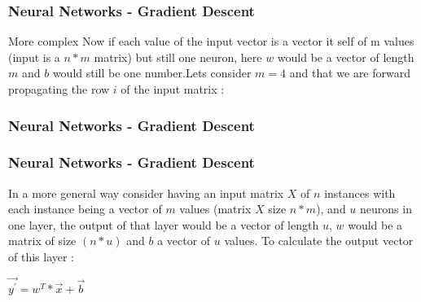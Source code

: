 \documentclass{beamer}
\begin{document}
\begin{frame}
\frametitle{Neural Networks - Gradient Descent}
\begin{block}{More complex}
Now if each value of the input vector is a vector it self of m values (input is a $ n*m $ matrix) but still one neuron, here $ w $ would be a vector of length $ m $ and $ b $ would still be one number.Lets consider $ m = 4 $ and that we are forward propagating the row $ i $ of the input matrix :\\
\end{block}
\end{frame}

\begin{frame}
\frametitle{Neural Networks - Gradient Descent}
\begin{center}
\end{center}
\end{frame}

\begin{frame}
\frametitle{Neural Networks - Gradient Descent}
\begin{block}{In a more general way}
consider having an input matrix $ X $ of $ n $ instances with each instance being a vector of $ m $ values (matrix $ X $ size $ n*m $), and $ u $ neurons in one layer, the output of that layer would be a vector of length $ u $, $ w $ would be a matrix of size $ (n*u) $ and $ b $ a vector of $ u $ values. To calculate the output vector of this layer :\\
\begin{center}
$ \vec{y^{\prime}} = w^{T}*\vec{x} + \vec{b} $
\end{center}
\end{block}
\end{frame}
\end{document}
